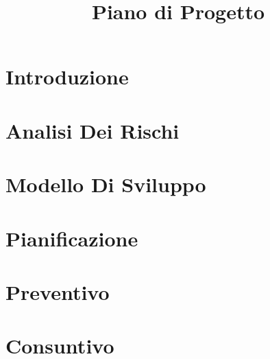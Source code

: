 \documentclass{classes/base}
\title{Piano di Progetto}
\author{\ruth}
\begin{document}
	\maketitle
	\newpage
	
	\newpage
	\tableofcontents
	\newpage
	\listoftables
	\newpage
	\listoffigures
	\newpage

	\section{Introduzione}
	
	
    \newpage
	\section{Analisi Dei Rischi}
	
	\newpage

	\section{Modello Di Sviluppo}
	

	\newpage
	\section{Pianificazione}
	

	\newpage
	\section{Preventivo}
	

	\newpage
	\section{Consuntivo}
	
	
\end{document}
